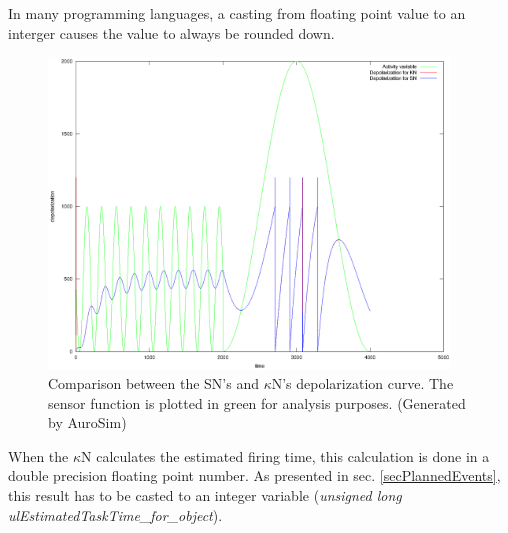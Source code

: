 In many programming languages, a casting from floating point value to an interger causes the value to always be rounded down.


\begin{figure}[hb!tp]
	\centering
		\includegraphics[width=0.95\textwidth]{eps_Comparison_between_the_two_sensors__depol_FIKSA}
	\caption{Comparison between the SN's and $\kappa$N's depolarization curve. The sensor function is plotted in green for analysis purposes. 
			(Generated by AuroSim)}
	\label{figComparisonBetweenSsensorAndKsensorDepolCurveFIXEdError}
\end{figure}

When the $\kappa$N calculates the estimated firing time, this calculation is done in a double precision floating point number. 
As presented in sec. \ref{secPlannedEvents}, this result has to be casted to an integer variable (\emph{unsigned long ulEstimatedTaskTime\_for\_object}).

